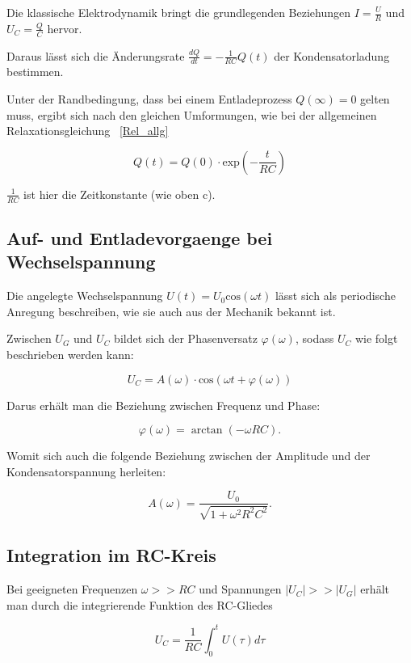 Die klassische Elektrodynamik bringt die grundlegenden Beziehungen $I = \frac{U}{R}$ und $U_C = \frac{Q}{C}$ 
hervor.

Daraus lässt sich die Änderungsrate $\frac{dQ}{dt} = -\frac{1}{RC}Q(t)$ der Kondensatorladung bestimmen. 

Unter der Randbedingung, dass bei einem Entladeprozess $Q(\infty) = 0$ gelten muss, ergibt sich nach den gleichen
Umformungen, wie bei der allgemeinen Relaxationsgleichung ~\eqref{Rel_allg}

\begin{equation}
    \label{RelQ}
Q(t) = Q(0)\cdot \textrm{exp}(-\frac{t}{RC})
\end{equation}

$\frac{1}{RC}$ ist hier die Zeitkonstante (wie oben c).


\subsection{Auf- und Entladevorgaenge bei Wechselspannung}
\label{subsec:Entladevorgaenge bei Wechselspannung}

Die angelegte Wechselspannung $U(t) = U_0 \textrm{cos}(\omega t)$ lässt sich als periodische Anregung beschreiben, 
wie sie auch aus der Mechanik bekannt ist.

Zwischen $U_G$ und $U_C$ bildet sich der Phasenversatz $\varphi(\omega)$, sodass $U_C$ wie folgt beschrieben werden
kann:

\begin{equation}
    U_C = A(\omega) \cdot \textrm{cos}(\omega t + \varphi(\omega))
\end{equation}

Darus erhält man die Beziehung zwischen Frequenz und Phase:

\begin{equation}
    \label{PhiArctan}
    \varphi\left(\omega\right)=\arctan\left(-\omega RC\right).
\end{equation}

Womit sich auch die folgende Beziehung zwischen der Amplitude und der Kondensatorspannung herleiten:

\begin{equation}
    \label{eqn:bezAU}
    A\left(\omega\right) = \frac{U_0}{\sqrt{1+\omega^2R^2C^2}}.
\end{equation}

\subsection{Integration im RC-Kreis}
\label{subsec:Integration im RC-Kreis}

Bei geeigneten Frequenzen $\omega >> RC$ und Spannungen $|U_C| >> |U_G|$ erhält man durch die integrierende Funktion des RC-Gliedes 

\begin{equation}
    \label{integrator}
    U_C = \frac{1}{RC} \int_{0}^{t} U(\tau) d\tau
\end{equation}


\cite{sample}
